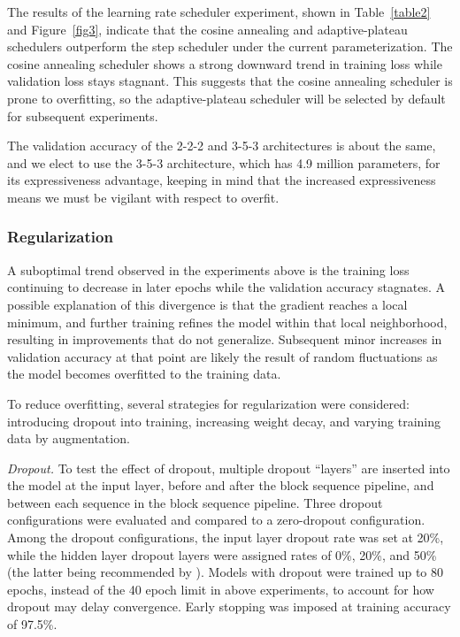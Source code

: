 \documentclass[letterpaper]{article} %
\begin{document}
The results of the learning rate scheduler experiment, shown in Table~\ref{table2} and Figure~\ref{fig3}, indicate that
the cosine annealing and adaptive-plateau schedulers outperform the step scheduler under the current
parameterization.
The cosine annealing scheduler shows a strong downward trend in training loss while validation loss
stays stagnant.
This suggests that the cosine annealing scheduler is prone to overfitting, so the
adaptive-plateau scheduler will be selected by default for subsequent experiments.

The validation accuracy of the 2-2-2 and 3-5-3 architectures is about the same,
and we elect to use the 3-5-3 architecture, which has 4.9 million parameters, for its expressiveness
advantage, keeping in mind that the increased expressiveness means we must be vigilant
with respect to overfit.

\subsubsection{Regularization}

A suboptimal trend observed in the experiments above is the training loss continuing to decrease in later
epochs while the validation accuracy stagnates.
A possible explanation of this divergence is that the gradient reaches a local minimum, and further training
refines the model within that local neighborhood, resulting in improvements that do not generalize.
Subsequent minor increases in validation accuracy at that point are likely the result of random fluctuations as the
model becomes overfitted to the training data.

To reduce overfitting, several strategies for regularization were considered:
introducing dropout into training, increasing weight decay, and varying training data by augmentation.

\textit{Dropout.}
To test the effect of dropout, multiple dropout ``layers'' are inserted into the model at the input layer,
before and after the block sequence pipeline, and between each sequence in the block sequence pipeline.
Three dropout configurations were evaluated and compared to a zero-dropout configuration.
Among the dropout configurations, the input layer dropout rate was set at 20\%, while the hidden layer
dropout layers were assigned rates of 0\%, 20\%, and 50\% (the latter being recommended by \cite{JMLR:v15:srivastava14a}).
Models with dropout were trained up to 80 epochs, instead of the 40 epoch limit in above experiments,
to account for how dropout may delay convergence.
Early stopping was imposed at training accuracy of 97.5\%.
\end{document}
